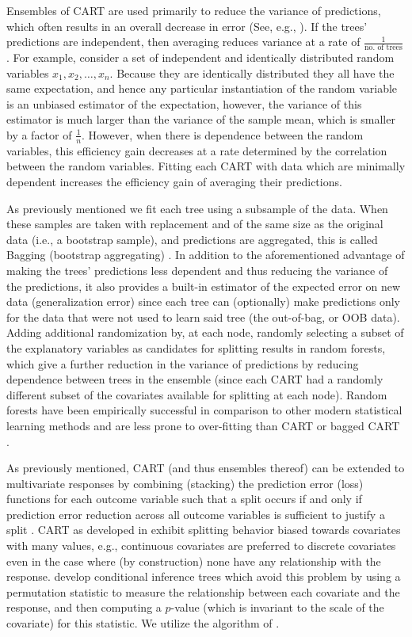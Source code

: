 \documentclass[titlepage, onecolumn,12pt]{article}
\begin{document}
Ensembles of CART are used primarily to reduce the variance of predictions, which often results in an overall decrease in error (See, e.g., \citep{fariss2014reproduction}). If the trees' predictions are independent, then averaging reduces variance at a rate of $\frac{1}{\text{no. of trees}}$.  For example, consider a set of independent and identically distributed random variables $x_1, x_2, \ldots, x_n$. Because they are identically distributed they all have the same expectation, and hence any particular instantiation of the random variable is an unbiased estimator of the expectation, however, the variance of this estimator is much larger than the variance of the sample mean, which is smaller by a factor of $\frac{1}{n}$. However, when there is dependence between the random variables, this efficiency gain decreases at a rate determined by the correlation between the random variables. Fitting each CART with data which are minimally dependent increases the efficiency gain of averaging their predictions.

As previously mentioned we fit each tree using a subsample of the data. When these samples are taken with replacement and of the same size as the original data (i.e., a bootstrap sample), and predictions are aggregated, this is called Bagging (bootstrap aggregating) \citep{breiman1996bagging}. In addition to the aforementioned advantage of making the trees' predictions less dependent and thus reducing the variance of the predictions, it also provides a built-in estimator of the expected error on new data (generalization error) since each tree can (optionally) make predictions only for the data that were not used to learn said tree (the out-of-bag, or OOB data). Adding additional randomization by, at each node, randomly selecting a subset of the explanatory variables as candidates for splitting results in random forests, which give a further reduction in the variance of predictions by reducing dependence between trees in the ensemble (since each CART had a randomly different subset of the covariates available for splitting at each node). Random forests have been empirically successful in comparison to other modern statistical learning methods and are less prone to over-fitting than CART or bagged CART \citep{fernandez2014we}.

As previously mentioned, CART (and thus ensembles thereof) can be extended to multivariate responses by combining (stacking) the prediction error (loss) functions for each outcome variable such that a split occurs if and only if prediction error reduction across all outcome variables is sufficient to justify a split \citep{de2002multivariate,segal2011multivariate,hothorn2006unbiased}. CART as developed in \citet{breiman2001random} exhibit splitting behavior biased towards covariates with many values, e.g., continuous covariates are preferred to discrete covariates even in the case where (by construction) none have any relationship with the response. \citet{hothorn2006unbiased} develop conditional inference trees which avoid this problem by using a permutation statistic to measure the relationship between each covariate and the response, and then computing a $p$-value (which is invariant to the scale of the covariate) for this statistic. We utilize the algorithm of \citet{hothorn2006unbiased}.
\end{document}
